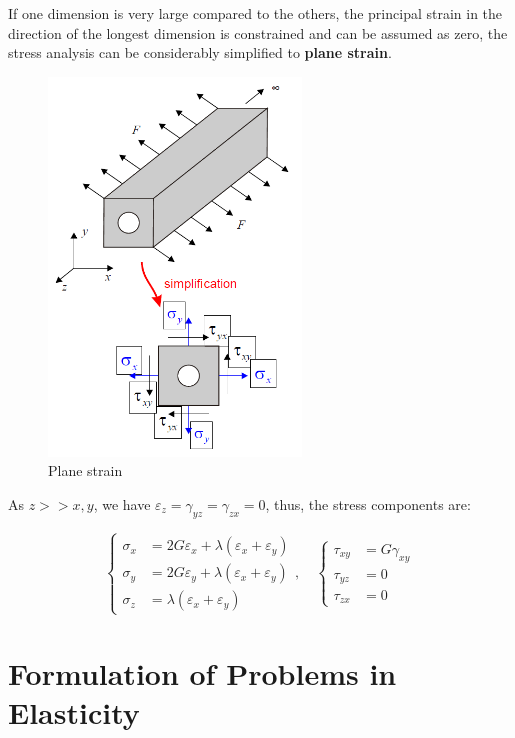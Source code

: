 \documentclass[en,hazy,cyan,8pt,normal]{elegantnote}
\numberwithin{equation}{section}
\begin{document}
    If one dimension is very large compared to the others, the principal strain in the direction of the longest dimension is constrained and can be assumed as zero, the stress analysis can be considerably simplified to \textbf{plane strain}.

    \begin{figure}[H]
      \centering
      \includegraphics[width=0.6\textwidth]{image/021.png}
      \caption{Plane strain}
      \label{fig:021}
    \end{figure}

    As $z>>x,y$, we have $\varepsilon_z=\gamma_{yz}=\gamma_{zx}=0$, thus, the stress components are:

    \begin{equation}\label{eq:074}
      \left\{
      \begin{aligned}
        \sigma_x &= 2G \varepsilon_x + \lambda(\varepsilon_x + \varepsilon_y) \\
        \sigma_y &= 2G \varepsilon_y + \lambda(\varepsilon_x + \varepsilon_y) \\
        \sigma_z &= \lambda(\varepsilon_x + \varepsilon_y)
      \end{aligned}
      \right.
      , \quad
      \left\{
      \begin{aligned}
        \tau_{xy} &= G \gamma_{xy}\\
        \tau_{yz} &= 0 \\
        \tau_{zx} &= 0
      \end{aligned}
      \right.
    \end{equation}


\section{Formulation of Problems in Elasticity}\label{sec:04}
\end{document}
